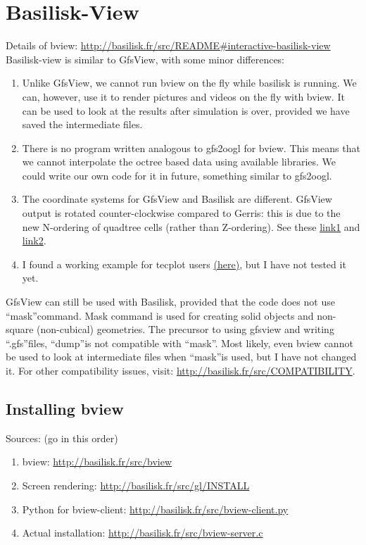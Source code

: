 \documentclass[]{article}
\newcommand\Colorhref[3][blue]{\href{#2}{\color{#1}#3}}
\begin{document}
\section{Basilisk-View}
Details of bview: \Colorhref{http://basilisk.fr/src/README\#interactive-basilisk-view}{http://basilisk.fr/src/README\#interactive-basilisk-view}\\
Basilisk-view is similar to GfsView, with some minor differences:
\begin{enumerate}
\item Unlike GfsView, we cannot run bview on the fly while basilisk is running. We can, however, use it to render pictures and videos on the fly with bview. It can be used to look at the results after simulation is over, provided we have saved the intermediate files.
\item There is no program written analogous to gfs2oogl for bview. This means that we cannot interpolate the octree based data using available libraries. We could write our own code for it in future, something similar to gfs2oogl.
\item The coordinate systems for GfsView and Basilisk are different. GfsView output is rotated counter-clockwise compared to Gerris: this is due to the new N-ordering of quadtree cells (rather than 
Z-ordering). See these \Colorhref{https://groups.google.com/forum/\#!topic/basilisk-fr/yGedVYOCz8E}{link1} and \Colorhref{https://groups.google.com/forum/\#!topic/basilisk-fr/A6TKu16wbsQ}{link2}.
\item I found a working example for tecplot users \Colorhref{http://basilisk.fr/sandbox/hiroumi/tecplot/}{(here)}, but I have not tested it yet. 
\end{enumerate}
GfsView can still be used with Basilisk, provided that the code does not use \textquotedblleft mask\textquotedblright command. Mask command is used for creating solid objects and non-square (non-cubical) geometries. The precursor to using gfsview and writing \textquotedblleft.gfs\textquotedblright files, \textquotedblleft dump\textquotedblright is not compatible with \textquotedblleft mask\textquotedblright. Most likely, even bview cannot be used to look at intermediate files when \textquotedblleft mask\textquotedblright is used, but I have not changed it. For other compatibility issues, visit: \Colorhref{http://basilisk.fr/src/COMPATIBILITY}{http://basilisk.fr/src/COMPATIBILITY}.
\subsection{Installing bview}
Sources: (go in this order)
\begin{enumerate}
\item bview: \Colorhref{http://basilisk.fr/src/bview}{http://basilisk.fr/src/bview}
\item Screen rendering: \Colorhref{http://basilisk.fr/src/gl/INSTALL}{http://basilisk.fr/src/gl/INSTALL}
\item Python for bview-client: \Colorhref{http://basilisk.fr/src/bview-client.py}{http://basilisk.fr/src/bview-client.py}
\item Actual installation: \Colorhref{http://basilisk.fr/src/bview-server.c}{http://basilisk.fr/src/bview-server.c}
\end{enumerate}
\end{document}
